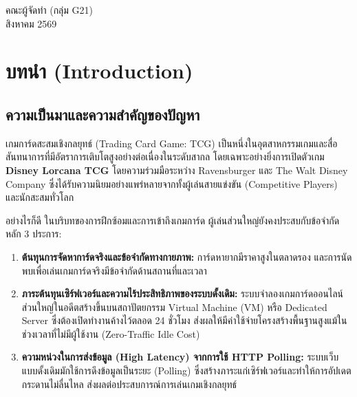 \documentclass[12pt,a4paper]{report}
\begin{document}
\vspace{1.2cm}
\begin{flushright}
คณะผู้จัดทำ (กลุ่ม G21)\\
สิงหาคม 2569
\end{flushright}

\newpage

\tableofcontents
\newpage
\listoftables
\newpage
\listoffigures
\newpage

\setcounter{page}{1}

\chapter{บทนำ (Introduction)}

\section{ความเป็นมาและความสำคัญของปัญหา}
เกมการ์ดสะสมเชิงกลยุทธ์ (Trading Card Game: TCG) เป็นหนึ่งในอุตสาหกรรมเกมและสื่อสันทนาการที่มีอัตราการเติบโตสูงอย่างต่อเนื่องในระดับสากล โดยเฉพาะอย่างยิ่งการเปิดตัวเกม \textbf{Disney Lorcana TCG} โดยความร่วมมือระหว่าง Ravensburger และ The Walt Disney Company ซึ่งได้รับความนิยมอย่างแพร่หลายจากทั้งผู้เล่นสายแข่งขัน (Competitive Players) และนักสะสมทั่วโลก

อย่างไรก็ดี ในบริบทของการฝึกซ้อมและการเข้าถึงเกมการ์ด ผู้เล่นส่วนใหญ่ยังคงประสบกับข้อจำกัดหลัก 3 ประการ:
\begin{enumerate}
    \item \textbf{ต้นทุนการจัดหาการ์ดจริงและข้อจำกัดทางกายภาพ:} การ์ดหายากมีราคาสูงในตลาดรอง และการนัดพบเพื่อเล่นเกมการ์ดจริงมีข้อจำกัดด้านสถานที่และเวลา
    \item \textbf{ภาระต้นทุนเซิร์ฟเวอร์และความไร้ประสิทธิภาพของระบบดั้งเดิม:} ระบบจำลองเกมการ์ดออนไลน์ส่วนใหญ่ในอดีตสร้างขึ้นบนสถาปัตยกรรม Virtual Machine (VM) หรือ Dedicated Server ซึ่งต้องเปิดทำงานค้างไว้ตลอด 24 ชั่วโมง ส่งผลให้มีค่าใช้จ่ายโครงสร้างพื้นฐานสูงแม้ในช่วงเวลาที่ไม่มีผู้ใช้งาน (Zero-Traffic Idle Cost)
    \item \textbf{ความหน่วงในการส่งข้อมูล (High Latency) จากการใช้ HTTP Polling:} ระบบเว็บแบบดั้งเดิมมักใช้การดึงข้อมูลเป็นระยะ (Polling) ซึ่งสร้างภาระแก่เซิร์ฟเวอร์และทำให้การอัปเดตกระดานไม่ลื่นไหล ส่งผลต่อประสบการณ์การเล่นเกมเชิงกลยุทธ์
\end{enumerate}
\end{document}
